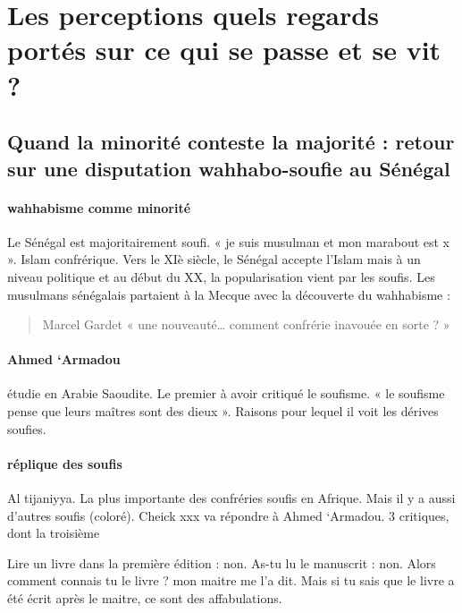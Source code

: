 




\section{Les perceptions quels regards portés sur ce qui se passe et se vit ?}
\mn{}
\subsection{Quand la minorité conteste la majorité : retour sur une disputation wahhabo-soufie au Sénégal}

\paragraph{wahhabisme comme minorité} Le Sénégal est majoritairement soufi.  « je suis musulman et mon marabout est x ». Islam confrérique. Vers le XIè siècle, le Sénégal accepte l’Islam mais à un niveau politique et au début du XX, la popularisation vient par les soufis. Les musulmans sénégalais partaient à la Mecque avec la découverte du wahhabisme : 
\begin{quote}
Marcel Gardet « une nouveauté… comment confrérie inavouée en sorte ? »
\end{quote}
\paragraph{Ahmed ‘Armadou} étudie en Arabie Saoudite. Le premier à avoir critiqué le soufisme. « le soufisme pense que leurs maîtres sont des dieux ». Raisons pour lequel il voit les dérives soufies. 
\paragraph{réplique des soufis} Al tijaniyya. La plus importante des confréries soufis en Afrique. Mais il y a aussi d’autres soufis (coloré).  Cheick xxx va répondre à Ahmed ‘Armadou. 3 critiques, dont la troisième
\begin{Ex}
  Lire un livre dans la première édition : non. As-tu lu le manuscrit : non. Alors comment connais tu le livre ? mon maitre me l’a dit. Mais si tu sais que le livre a été écrit après le maitre, ce sont des affabulations. 
\end{Ex} 

